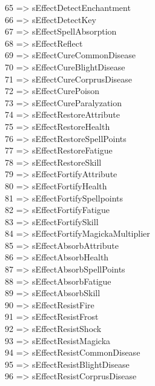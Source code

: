 \documentclass[
]{article}
\begin{document}
65 =\textgreater{} sEffectDetectEnchantment\\
66 =\textgreater{} sEffectDetectKey\\
67 =\textgreater{} sEffectSpellAbsorption\\
68 =\textgreater{} sEffectReflect\\
69 =\textgreater{} sEffectCureCommonDisease\\
70 =\textgreater{} sEffectCureBlightDisease\\
71 =\textgreater{} sEffectCureCorprusDisease\\
72 =\textgreater{} sEffectCurePoison\\
73 =\textgreater{} sEffectCureParalyzation\\
74 =\textgreater{} sEffectRestoreAttribute\\
75 =\textgreater{} sEffectRestoreHealth\\
76 =\textgreater{} sEffectRestoreSpellPoints\\
77 =\textgreater{} sEffectRestoreFatigue\\
78 =\textgreater{} sEffectRestoreSkill\\
79 =\textgreater{} sEffectFortifyAttribute\\
80 =\textgreater{} sEffectFortifyHealth\\
81 =\textgreater{} sEffectFortifySpellpoints\\
82 =\textgreater{} sEffectFortifyFatigue\\
83 =\textgreater{} sEffectFortifySkill\\
84 =\textgreater{} sEffectFortifyMagickaMultiplier\\
85 =\textgreater{} sEffectAbsorbAttribute\\
86 =\textgreater{} sEffectAbsorbHealth\\
87 =\textgreater{} sEffectAbsorbSpellPoints\\
88 =\textgreater{} sEffectAbsorbFatigue\\
89 =\textgreater{} sEffectAbsorbSkill\\
90 =\textgreater{} sEffectResistFire\\
91 =\textgreater{} sEffectResistFrost\\
92 =\textgreater{} sEffectResistShock\\
93 =\textgreater{} sEffectResistMagicka\\
94 =\textgreater{} sEffectResistCommonDisease\\
95 =\textgreater{} sEffectResistBlightDisease\\
96 =\textgreater{} sEffectResistCorprusDisease\\
\end{document}
